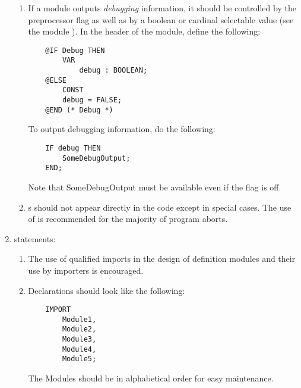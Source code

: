 \begin{enumerate}
\begin{enumerate}
    \item
        If a module outputs {\em debugging} information, it should 
	be controlled by the preprocessor flag  as well 
	as by a boolean or cardinal selectable value (see the module 
	).  In the header of the module, define the
	following:
        \begin{verbatim}
    @IF Debug THEN
        VAR
     	    debug : BOOLEAN;
    @ELSE
        CONST
	    debug = FALSE;
    @END (* Debug *)
        \end{verbatim}
	 To output debugging information, do the following:
        \begin{verbatim}
    IF debug THEN
        SomeDebugOutput;
    END;
        \end{verbatim}
	Note that SomeDebugOutput must be available even if the
	 flag is off.
    

    \item
        s should not appear directly in the
        code except in special cases.  The use of 
	\newline
	is recommended for the majority of program aborts.
    \end{enumerate}

\item
     statements:
    \begin{enumerate}
    \item
        The use of qualified imports in the design of definition modules
	and their use by importers is encouraged.
    \item
        Declarations should look like the following:
        \begin{verbatim}
    IMPORT
        Module1,     
        Module2,     
        Module3,     
        Module4,  
        Module5;
        \end{verbatim}
        The Modules should be in alphabetical order for easy maintenance.

    \end{enumerate}
    

\end{enumerate}
